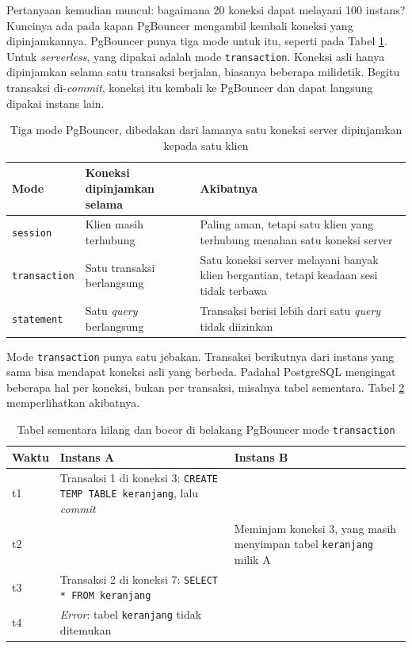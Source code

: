 Pertanyaan kemudian muncul: bagaimana 20 koneksi dapat melayani 100 instans?
Kuncinya ada pada kapan PgBouncer mengambil kembali koneksi yang
dipinjamkannya. PgBouncer punya tiga mode untuk itu, seperti pada Tabel
\ref{tab:mode-pgbouncer}. Untuk \textit{serverless}, yang dipakai adalah mode
\texttt{transaction}. Koneksi asli hanya dipinjamkan selama satu transaksi
berjalan, biasanya beberapa milidetik. Begitu transaksi di-\textit{commit},
koneksi itu kembali ke PgBouncer dan dapat langsung dipakai instans lain.

\begin{table}[!htb]
  \centering
  \caption{Tiga mode PgBouncer, dibedakan dari lamanya satu koneksi server
           dipinjamkan kepada satu klien}
  \label{tab:mode-pgbouncer}
  \begin{tabularx}{\textwidth}{lXX}
    \hline
    \textbf{Mode} & \textbf{Koneksi dipinjamkan selama} & \textbf{Akibatnya} \\
    \hline
    \texttt{session} & Klien masih terhubung & Paling aman, tetapi satu klien yang terhubung menahan satu koneksi server \\
    \hline
    \texttt{transaction} & Satu transaksi berlangsung & Satu koneksi server melayani banyak klien bergantian, tetapi keadaan sesi tidak terbawa \\
    \hline
    \texttt{statement} & Satu \textit{query} berlangsung & Transaksi berisi lebih dari satu \textit{query} tidak diizinkan \\
    \hline
  \end{tabularx}
\end{table}

Mode \texttt{transaction} punya satu jebakan. Transaksi berikutnya dari
instans yang sama bisa mendapat koneksi asli yang berbeda. Padahal PostgreSQL
mengingat beberapa hal per koneksi, bukan per transaksi, misalnya tabel
sementara. Tabel \ref{tab:jebakan-transaction} memperlihatkan akibatnya.

\begin{table}[!htb]
  \centering
  \caption{Tabel sementara hilang dan bocor di belakang PgBouncer mode
           \texttt{transaction}}
  \label{tab:jebakan-transaction}
  \begin{tabularx}{\textwidth}{lXX}
    \hline
    \textbf{Waktu} & \textbf{Instans A} & \textbf{Instans B} \\
    \hline
    t1 & Transaksi 1 di koneksi 3: \texttt{CREATE TEMP TABLE keranjang}, lalu \textit{commit} & \\
    \hline
    t2 & & Meminjam koneksi 3, yang masih menyimpan tabel \texttt{keranjang} milik A \\
    \hline
    t3 & Transaksi 2 di koneksi 7: \texttt{SELECT * FROM keranjang} & \\
    \hline
    t4 & \textit{Error}: tabel \texttt{keranjang} tidak ditemukan & \\
    \hline
  \end{tabularx}
\end{table}

